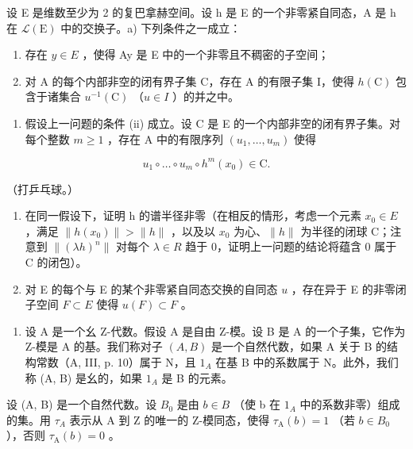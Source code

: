 设 E 是维数至少为 2 的复巴拿赫空间。设 h 是 E 的一个非零紧自同态，A 是 h 在 \(\mathcal{L}(\mathrm{E})\) 中的交换子。a) 下列条件之一成立：

\begin{enumerate}
\def\labelenumi{(\roman{enumi})}
\item
  存在 \(y \in E\) ，使得 Ay 是 E 中的一个非零且不稠密的子空间；
\item
  对 A 的每个内部非空的闭有界子集 C，存在 A 的有限子集 I，使得 \(h(\mathrm{C})\) 包含于诸集合 \(u^{-1}(\mathrm{C})\) （\(u \in I\) ）的并之中。
\end{enumerate}

\begin{enumerate}
\def\labelenumi{\alph{enumi})}
\setcounter{enumi}{1}
\tightlist
\item
  假设上一问题的条件 (ii) 成立。设 C 是 E 的一个内部非空的闭有界子集。对每个整数 \(m \geqslant 1\) ，存在 A 中的有限序列 \((u_{1}, \ldots, u_{m})\) 使得
\end{enumerate}

\[
u _ {1} \circ \dots \circ u _ {m} \circ h ^ {m} (x _ {0}) \in \mathrm{C}.
\]

（打乒乓球。）

\begin{enumerate}
\def\labelenumi{\alph{enumi})}
\setcounter{enumi}{2}
\item
  在同一假设下，证明 h 的谱半径非零（在相反的情形，考虑一个元素 \(x_{0} \in E\) ，满足 \(\|h(x_{0})\| > \|h\|\) ，以及以 \(x_{0}\) 为心、\(\|h\|\) 为半径的闭球 C；注意到 \(\|( \lambda h)^{n}\|\) 对每个 \(\lambda \in R\) 趋于 0，证明上一问题的结论将蕴含 0 属于 C 的闭包）。
\item
  对 E 的每个与 E 的某个非零紧自同态交换的自同态 \(u\) ，存在异于 E 的非零闭子空间 \(F \subset E\) 使得 \(u(F) \subset F\) 。
\end{enumerate}

\begin{enumerate}
\def\labelenumi{\arabic{enumi})}
\setcounter{enumi}{5}
\tightlist
\item
  设 A 是一个幺 Z-代数。假设 A 是自由 Z-模。设 B 是 A 的一个子集，它作为 Z-模是 A 的基。我们称对子 \((A, B)\) 是一个自然代数，如果 A 关于 B 的结构常数（A, III, p. 10）属于 N，且 \(1_{A}\) 在基 B 中的系数属于 N。此外，我们称 (A, B) 是幺的，如果 \(1_{A}\) 是 B 的元素。
\end{enumerate}

设 (A, B) 是一个自然代数。设 \(B_{0}\) 是由 \(b \in B\) （使 b 在 \(1_{A}\) 中的系数非零）组成的集。用 \(\tau_{A}\) 表示从 A 到 Z 的唯一的 Z-模同态，使得 \(\tau_{\mathrm{A}}(b) = 1\) （若 \(b \in B_{0}\) ），否则 \(\tau_{\mathrm{A}}(b) = 0\) 。

